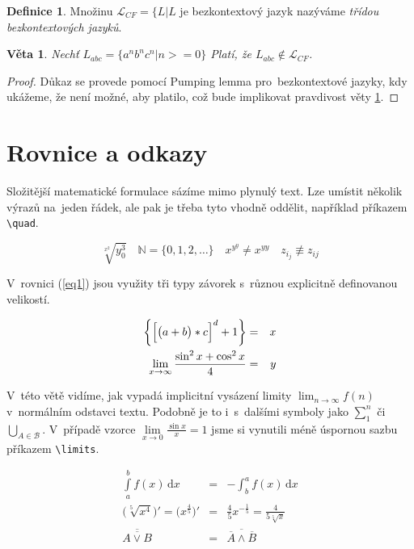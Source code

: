 \documentclass[11pt, a4paper, twocolumn]{article}
\theoremstyle{definition}
\newtheorem{definition}{Definice}[section]
\theoremstyle{plain}
\newtheorem{sentence}{Věta}
\begin{document}
\begin{definition} Množinu $\mathcal{L}_{CF} = \{L|L$ je bezkontextový jazyk nazýváme \emph{třídou bezkontextových jazyků}.
\end{definition}

\begin{sentence}\label{sentence}Nechť ${L}_{abc}=\{a^nb^nc^n|n >= 0\}$ Platí, že  $L_{abc} \notin \mathcal{L}_{CF}$.
\end{sentence}
\begin{proof}Důkaz se provede pomocí Pumping lemma pro~bezkontextové jazyky, kdy ukážeme, že není možné, aby platilo, což bude implikovat pravdivost věty \ref{sentence}.
\end{proof}

\section{Rovnice a odkazy}
Složitější matematické formulace sázíme mimo plynulý text. Lze umístit několik výrazů na~jeden řádek, ale pak je třeba tyto vhodně oddělit, například příkazem \verb|\quad|. 

$$\sqrt[x^2]{y^3_0} \quad \mathbb{N}=\{0,1,2,\ldots\}\quad x^{y^y} \neq x^{yy} \quad z_{i_j} \not\equiv z_{ij} $$

V~rovnici (\ref{eq1}) jsou využity tři typy závorek s~různou explicitně definovanou velikostí.

\begin{eqnarray}
\bigg\{\Big[\big(a + b\big) * c\Big]^d + 1\bigg\} & = & x \label{eq1} \\
\lim\limits_{x \to \infty}\frac{\textup{sin}^2\,{x} + \textup{cos}^2\,{x}}{4} & = & y \nonumber
\end{eqnarray}

V~této větě vidíme, jak vypadá implicitní vysázení limity $\lim_{n\to\infty} f(n)$ v~normálním odstavci textu. Podobně je to i~s~dalšími symboly jako $\sum_{1}^n$ či $\bigcup_{A \in\mathcal{B}}$. V~případě vzorce $\lim\limits_{x \to 0}\frac{\sin{x}}{x} = 1$ jsme si vynutili méně úspornou sazbu příkazem \verb|\limits|.

\begin{eqnarray}
\int\limits_{a}^{b}f(x)\,\mathrm{d}x & = & -\int_b^af(x)\,\mathrm{d}x\\
\Big(\sqrt[5]{x^4}\Big)' = \Big(x^{\frac{4}{5}}\Big)' & = & \frac{4}{5}x^{-\frac{1}{5}} = \frac{4}{5\sqrt[5]{x}}\\
\overline{\overline{A\vee B}} & = & \overline{\overline{A}\wedge \overline{B}}\ \end{eqnarray}
\end{document}
